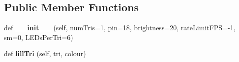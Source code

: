 \subsection*{Public Member Functions}
\begin{DoxyCompactItemize}
\item 
\mbox{\label{classglowbit_1_1triangle_a0bfe6a7a021dc7d69bae6c403e28e0f3}} 
def {\bfseries \+\_\+\+\_\+init\+\_\+\+\_\+} (self, num\+Tris=1, pin=18, brightness=20, rate\+Limit\+F\+PS=-\/1, sm=0, L\+E\+Ds\+Per\+Tri=6)
\item 
\mbox{\label{classglowbit_1_1triangle_a26f35bf61d507d755ce039f4a0210c08}} 
def {\bfseries fill\+Tri} (self, tri, colour)
\end{DoxyCompactItemize}
